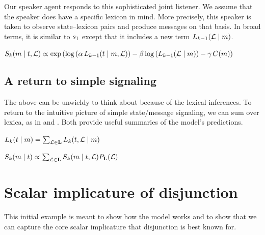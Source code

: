 \documentclass{article}
\begin{document}
Our speaker agent responds to this sophisticated joint listener.  We
assume that the speaker does have a specific lexicon in mind.  More
precisely, this speaker is taken to observe state--lexicon pairs and
produce messages on that basis. In broad terms, it is similar to
$\speakerOne$ except that it includes a new term
$\ListenerK[k-1](\Lex\given\msg)$.

\begin{examples}  
  \item\label{Sk}%
    $\SpeakerK(\msg \given \state, \Lex) \propto 
    \exp
    \left(
      \log
      \left(\alpha\,\ListenerK[k-1](\state \given \msg, \Lex)\right)
      - 
      \beta \log\left(\ListenerK[k-1](\Lex\given\msg)\right)
      -
      \gamma\,\Costs(\msg)
    \right)$
\end{examples}


\subsection{A return to simple signaling}\label{sec:return}

The above can be unwieldy to think about because of the lexical
inferences. To return to the intuitive picture of simple
state/message signaling, we can sum over lexica, as in 
 and . Both provide useful summaries
of the model's predictions.
%
\begin{examples}
\item\label{lisnorm}%
  $\ListenerK(\state \given \msg)  = 
  \sum_{\Lex \in \LexSet} \ListenerK(\state, \Lex \given \msg)$
\item\label{spknorm}%
  $\SpeakerK(\msg \given \state) \propto 
  \sum_{\Lex \in \LexSet} \SpeakerK(\msg \given \state, \Lex)
  \LexPrior(\Lex)$
\end{examples}




\section{Scalar implicature of disjunction}\label{sec:scalar-disj}

This initial example is meant to show how the model works and to show
that we can capture the core scalar implicature that disjunction is
best known for.
\end{document}
